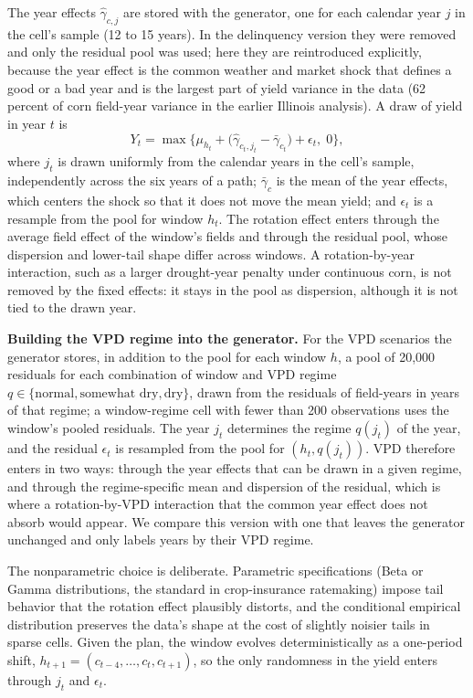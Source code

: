 \documentclass[11pt,letterpaper]{article}
\theoremstyle{remark}
\begin{document}
The year effects $\hat\gamma_{c,j}$ are stored with the generator, one for each calendar year $j$ in the cell's sample (12 to 15 years). In the delinquency version they were removed and only the residual pool was used; here they are reintroduced explicitly, because the year effect is the common weather and market shock that defines a good or a bad year and is the largest part of yield variance in the data (62 percent of corn field-year variance in the earlier Illinois analysis). A draw of yield in year $t$ is
\begin{equation}
Y_t = \max\Big\{\mu_{h_t} + \big(\hat\gamma_{c_t,j_t} - \bar\gamma_{c_t}\big) + \epsilon_t,\; 0\Big\}, \label{eq:yield}
\end{equation}
where $j_t$ is drawn uniformly from the calendar years in the cell's sample, independently across the six years of a path; $\bar\gamma_{c}$ is the mean of the year effects, which centers the shock so that it does not move the mean yield; and $\epsilon_t$ is a resample from the pool for window $h_t$. The rotation effect enters through the average field effect of the window's fields and through the residual pool, whose dispersion and lower-tail shape differ across windows. A rotation-by-year interaction, such as a larger drought-year penalty under continuous corn, is not removed by the fixed effects: it stays in the pool as dispersion, although it is not tied to the drawn year.

\textbf{Building the VPD regime into the generator.} For the VPD scenarios the generator stores, in addition to the pool for each window $h$, a pool of 20,000 residuals for each combination of window and VPD regime $q\in\{\text{normal},\text{somewhat dry},\text{dry}\}$, drawn from the residuals of field-years in years of that regime; a window-regime cell with fewer than 200 observations uses the window's pooled residuals. The year $j_t$ determines the regime $q(j_t)$ of the year, and the residual $\epsilon_t$ is resampled from the pool for $(h_t, q(j_t))$. VPD therefore enters in two ways: through the year effects that can be drawn in a given regime, and through the regime-specific mean and dispersion of the residual, which is where a rotation-by-VPD interaction that the common year effect does not absorb would appear. We compare this version with one that leaves the generator unchanged and only labels years by their VPD regime.

The nonparametric choice is deliberate. Parametric specifications (Beta or Gamma distributions, the standard in crop-insurance ratemaking) impose tail behavior that the rotation effect plausibly distorts, and the conditional empirical distribution preserves the data's shape at the cost of slightly noisier tails in sparse cells. Given the plan, the window evolves deterministically as a one-period shift, $h_{t+1} = (c_{t-4}, \ldots, c_t, c_{t+1})$, so the only randomness in the yield enters through $j_t$ and $\epsilon_t$.
\end{document}
